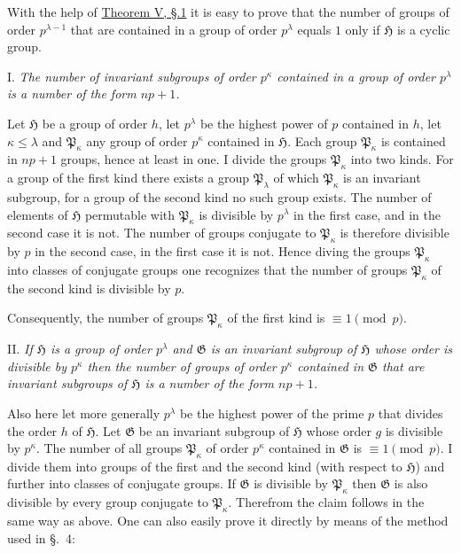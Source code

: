 \documentclass[a5paper,12pt]{article}
\let\fr\mathfrak
\newcommand{\CG}{\fr{G}}
\newcommand{\CH}{\fr{H}}
\newcommand{\CP}{\fr{P}}
\newcommand{\?}{{\color{blue}${}^{(?)}$}}
\newcounter{origpagecounter}{}
\newcommand{\origpagebreak}{\mark{\arabic{origpagecounter}}\addtocounter{origpagecounter}{1}\mark{\arabic{origpagecounter}}}
\begin{document}

With the help of 
\hyperref[t:1-5]{Theorem V, \S.1}
it is easy to prove
that the number of groups of order $p^{\lambda-1}$
that are contained in a group of order $p^\lambda$
equals $1$
only if
$\CH$ is a cyclic group.


I.
%
\label{t:5-1}
%
\emph{ %
The number of invariant subgroups of order $p^\kappa$
contained in a group of order $p^\lambda$
is a number of the form $n p + 1$.
}


Let $\CH$ be a group of order $h$,
let $p^\lambda$ be the highest power of $p$ contained in $h$,
let $\kappa \leq \lambda$
and
$\CP_\kappa$ any group of order $p^\kappa$
contained in $\CH$.
%
%
Each group $\CP_\kappa$ is contained in $n p + 1$ groups,
hence at least in one.
%
%
I divide the groups $\CP_\kappa$
into two kinds.
%
%
For a group of the first kind
there exists 
a group $\CP_\lambda$
of which $\CP_\kappa$ is an invariant subgroup,
for a group of the second kind
no such group exists.
%
%
The number of elements of $\CH$
permutable with $\CP_\kappa$
is divisible by $p^\lambda$ in the first case,
and
in the second case it is not.
%
%
The number of groups
conjugate to $\CP_\kappa$ is therefore
divisible by $p$ in the second case,
in the first case it is not.
%
%
Hence diving the groups $\CP_\kappa$
into classes of conjugate groups
one recognizes
that the number of groups $\CP_\kappa$
of the second kind 
is divisible by $p$.
%
%
\origpagebreak
%
%
Consequently,
the number of groups $\CP_\kappa$ of the first kind
is $\equiv 1 \pmod{p}$.


II.
%
\label{t:5-2}
%
\emph{ %
If $\CH$ is a group of order $p^\lambda$
and $\CG$ is an invariant subgroup of $\CH$
whose order is divisible by $p^\kappa$
then the number of groups of order $p^\kappa$
contained in $\CG$
that are invariant subgroups of $\CH$
is
a number of the form $n p + 1$.
}


Also here let more generally
$p^\lambda$ be the highest power of the prime $p$
that divides the order $h$ of $\CH$.
%
%
Let $\CG$ be an invariant subgroup of $\CH$
whose order $g$ is divisible by $p^\kappa$.
%
%
The number of all groups $\CP_\kappa$ of order $p^\kappa$
contained in $\CG$
is $\equiv 1 \pmod{p}$.
%
%
I divide them into groups of the first and the second kind
(with respect to $\CH$)
and
further
into classes of conjugate groups.
%
%
If $\CG$ is divisible by $\CP_\kappa$
then
$\CG$ is also divisible by every group
conjugate to $\CP_\kappa$.
%
%
Therefrom
the claim follows in the same way as above.
%
%
One can also easily prove it directly
by means of the method
used in \S.~4:
\end{document}
